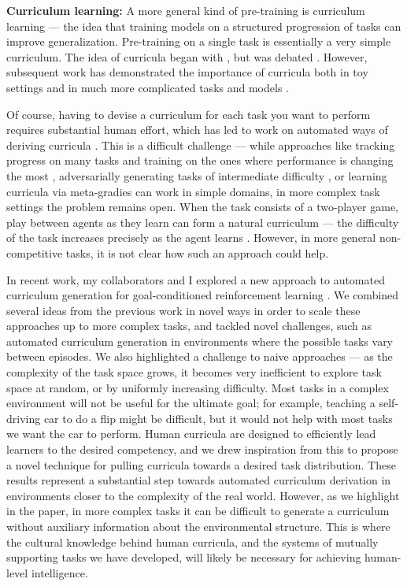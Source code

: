 \textbf{Curriculum learning:} A more general kind of pre-training is curriculum learning \citep{Bengio2009} --- the idea that training models on a structured progression of tasks can improve generalization. Pre-training on a single task is essentially a very simple curriculum. The idea of curricula began with \citet{Elman1993}, but was debated \citep[e.g.][]{Rohde1997}. However, subsequent work has demonstrated the importance of curricula both in toy settings \citep{Gulcehre2013} and in much more complicated tasks and models \citep[e.g.][]{Zaremba2014, Graves2016}. \par
Of course, having to devise a curriculum for each task you want to perform requires substantial human effort, which has led to work on automated ways of deriving curricula \citep{Graves2017}. This is a difficult challenge --- while approaches like tracking progress on many tasks and training on the ones where performance is changing the most \citep{Baranes2013}, adversarially generating tasks of intermediate difficulty \citep{Florensa2018}, or learning curricula via meta-gradies \citep{Such2019} can work in simple domains, in more complex task settings the problem remains open. When the task consists of a two-player game, play between agents as they learn can form a natural curriculum --- the difficulty of the task increases precisely as the agent learns \citep{Silver2017, Jaderberg2019}. However, in more general non-competitive tasks, it is not clear how such an approach could help. \par 
In recent work, my collaborators and I explored a new approach to automated curriculum generation for goal-conditioned reinforcement learning \citep{Racaniere2019}. We combined several ideas from the previous work in novel ways in order to scale these approaches up to more complex tasks, and tackled novel challenges, such as automated curriculum generation in environments where the possible tasks vary between episodes. We also highlighted a challenge to naive approaches --- as the complexity of the task space grows, it becomes very inefficient to explore task space at random, or by uniformly increasing difficulty. Most tasks in a complex environment will not be useful for the ultimate goal; for example, teaching a self-driving car to do a flip might be difficult, but it would not help with most tasks we want the car to perform. Human curricula are designed to efficiently lead learners to the desired competency, and we drew inspiration from this to propose a novel technique for pulling curricula towards a desired task distribution. These results represent a substantial step towards automated curriculum derivation in environments closer to the complexity of the real world. However, as we highlight in the paper, in more complex tasks it can be difficult to generate a curriculum without auxiliary information about the environmental structure. This is where the cultural knowledge behind human curricula, and the systems of mutually supporting tasks we have developed, will likely be necessary for achieving human-level intelligence. \par 

